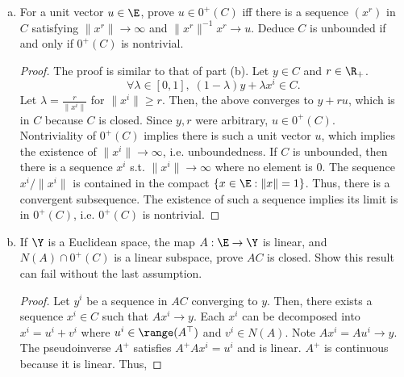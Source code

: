 \documentclass[12pt, letterpaper]{article}
\numberwithin{equation}{subsection}
\begin{document}
\begin{enumerate}[(a)]
\begin{proof}
First, the reverse inclusion. Suppose $d\in \bigcap 0^+(C_\gamma)$.
Then, for every $C_\gamma$, $C_\gamma+\R_+d\subset C_\gamma$. 
Then, if $c\in \bigcap C_\gamma$, we have $c+\R_+d\subset C_\gamma$ 
for every $\gamma\in\Gamma$, i.e. $d \in 0^+(\bigcap C_\gamma)$. \\
For the forward inclusion, suppose $d\in 0^+\left(\bigcap C_\gamma\right)$.
Then for some $x\in\bigcap C_\gamma$, $x+\R_+d\subset \bigcap C_\gamma$.
In other words, for every $C_\gamma$, there is $x\in C_\gamma$ s.t. 
$x+\R_+d \subset C_\gamma$. By the previous part, this implies 
$d\in 0^+(C_\gamma)$. Thus, $d\in\bigcap 0^+(C_\gamma)$.
\end{proof}
\item For a unit vector $u\in\E$, prove $u\in0^+(C)$ iff there is 
a sequence $(x^r)$ in $C$ satisfying $\|x^r\|\to\infty$ and 
$\|x^r\|^{-1}x^r\to u$. Deduce $C$ is unbounded if and only if 
$0^+(C)$ is nontrivial.
\begin{proof}
The proof is similar to that of part (b). Let $y\in C$ and $r\in\R_+$. 
\begin{equation*}
\forall \lambda\in[0,1],\; (1-\lambda)y + \lambda x^i \in C.
\end{equation*}
Let $\lambda = \frac{r}{\|x^i\|}$ for $\|x^i\|\geq r$. Then, the 
above converges to $y+ru$, which is in $C$ because $C$ is closed.
 Since $y,r$ were arbitrary, $u\in 0^+(C)$. \\
Nontriviality of $0^+(C)$ implies there is such a unit vector $u$,
which implies the existence of $\|x^i\|\to\infty$, i.e. unboundedness. 
If $C$ is unbounded, then there is a sequence $x^i$ s.t. $\|x^i\|\to\infty$
where no element is 0.
The sequence $x^i/\|x^i\|$ is contained in the compact $\{x\in\E:\|x\|=1\}$.
Thus, there is a convergent subsequence. The existence of such a 
sequence implies its limit is in $0^+(C)$, i.e. $0^+(C)$ is nontrivial.
\end{proof}
\item If $\Y$ is a Euclidean space, the map $A:\E\to\Y$ is linear, 
and $N(A)\cap0^+(C)$ is a linear subspace, prove $AC$ is closed. 
Show this result can fail without the last assumption. 
\begin{proof}
Let $y^i$ be a sequence in $AC$ converging to $y$. Then, there exists 
a sequence $x^i\in C$ such that $Ax^i\to y$. Each $x^i$ can be 
decomposed into $x^i = u^i+ v^i$ where $u^i\in\range(A^\top)$ and 
$v^i\in N(A)$. Note $Ax^i=Au^i\to y$.
The pseudoinverse $A^+$ satisfies $A^+Ax^i = u^i$ and 
is linear. $A^+$ is continuous because it is linear. Thus, 

\end{proof}
\end{enumerate}
\end{document}
